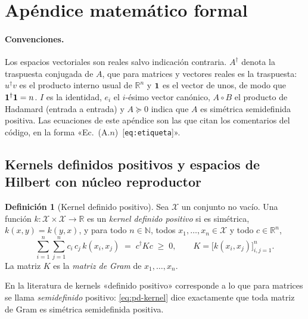 \documentclass[11pt,a4paper]{article}
\newcommand{\R}{\mathbb{R}}
\newcommand{\N}{\mathbb{N}}
\newcommand{\X}{\mathcal{X}}
\newcommand{\dg}{\dagger}                         %
\newcommand{\code}[1]{\texttt{#1}}
\theoremstyle{plain}
\theoremstyle{definition}
\newtheorem{definicion}[teorema]{Definición}
\theoremstyle{remark}
\numberwithin{equation}{section}
\begin{document}
\clearpage
\appendix
\section{Apéndice matemático formal}\label{sec:apendice}

\paragraph{Convenciones.} Los espacios vectoriales son reales salvo indicación contraria.
$A^{\dg}$ denota la traspuesta conjugada de $A$, que para matrices y vectores reales es
la traspuesta: $u^{\dg}v$ es el producto interno usual de $\R^n$ y $\mathbf{1}$ es el vector de
unos, de modo que $\ones^{\dg}\ones=n$. $I$ es la identidad, $e_i$ el $i$-ésimo vector
canónico, $A\circ B$ el producto de Hadamard (entrada a entrada) y $A\succeq0$ indica que $A$
es simétrica semidefinida positiva. Las ecuaciones de este apéndice son las que citan los
comentarios del código, en la forma «Ec.~(A.$n$)~[\code{eq:etiqueta}]».

\subsection{Kernels definidos positivos y espacios de Hilbert con núcleo reproductor}
\label{sec:rkhs}

\begin{definicion}[Kernel definido positivo]
Sea $\X$ un conjunto no vacío. Una función $k\colon\X\times\X\to\R$ es un \emph{kernel
definido positivo} si es simétrica, $k(x,y)=k(y,x)$, y para todo $n\in\N$, todos
$x_1,\dots,x_n\in\X$ y todo $c\in\R^n$,
\begin{equation}\label{eq:pd-kernel}
  \sum_{i=1}^n\sum_{j=1}^n c_i\,c_j\,k(x_i,x_j) \;=\; c^{\dg}Kc \;\ge\; 0,
  \qquad K=\bigl[k(x_i,x_j)\bigr]_{i,j=1}^n .
\end{equation}
La matriz $K$ es la \emph{matriz de Gram} de $x_1,\dots,x_n$.
\end{definicion}

En la literatura de kernels «definido positivo» corresponde a lo que para matrices se llama
\emph{semidefinido} positivo: \eqref{eq:pd-kernel} dice exactamente que toda matriz de Gram
es simétrica semidefinida positiva.
\end{document}
